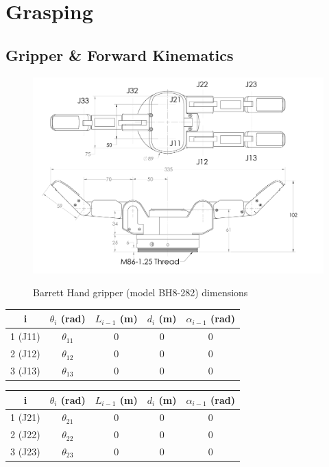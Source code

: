 \section{Grasping}

\subsection{Gripper \& Forward Kinematics}

\begin{center}
\begin{figure}[H]
\centering
\includegraphics[width=12cm]{images/bh8-282-dimensions.png}\\
\caption{Barrett Hand gripper (model BH8-282) dimensions}
\end{figure}
\end{center}

\begin{center}
\begin{tabular}{ |c|c|c|c|c| } 
\hline
i & $θ_i$ (rad) & $L_{i-1}$ (m) & $d_i$ (m) & $α_{i-1}$ (rad) \\
\hline
1 (J11) & $θ_{11}$ & 0 & 0 & 0 \\
2 (J12) & $θ_{12}$ & 0 & 0 & 0 \\
3 (J13) & $θ_{13}$ & 0 & 0 & 0 \\
\hline
\end{tabular}
\end{center}

\begin{center}
\begin{tabular}{ |c|c|c|c|c| } 
\hline
i & $θ_i$ (rad) & $L_{i-1}$ (m) & $d_i$ (m) & $α_{i-1}$ (rad) \\
\hline
1 (J21) & $θ_{21}$ & 0 & 0 & 0 \\
2 (J22) & $θ_{22}$ & 0 & 0 & 0 \\
3 (J23) & $θ_{23}$ & 0 & 0 & 0 \\
\hline
\end{tabular}
\end{center}


